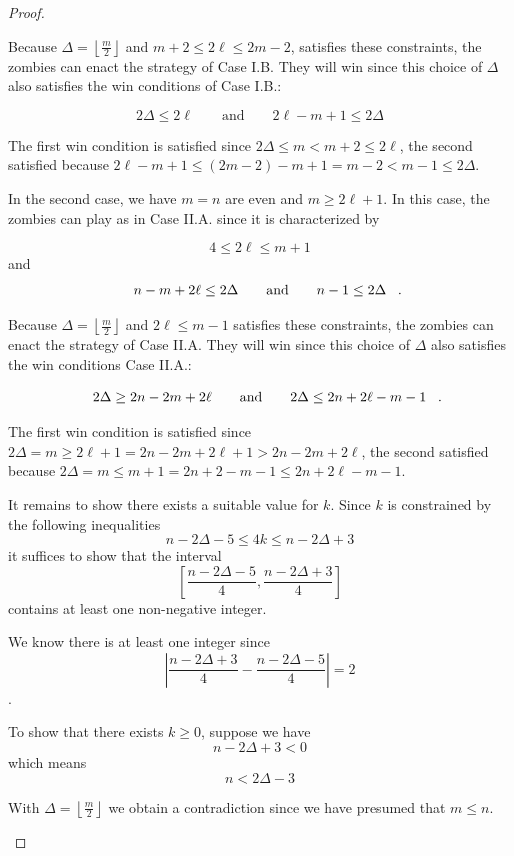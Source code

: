 \begin{proof}
\begin{proofpart}
Because $\Delta  = \left\lfloor \frac{m}{2} \right\rfloor$ and $m+2 \leq 2\ell \leq 2m-2$, satisfies these constraints, the zombies can enact the strategy of Case I.B. They will win since this choice of $\Delta$ also satisfies the win conditions of Case I.B.:

\[ 2\Delta \leq 2 \ell \qquad \text{and} \qquad 2\ell -m+1 \leq 2\Delta \]

The first win condition is satisfied since $2\Delta \leq m < m+2 \leq 2\ell$, the second satisfied because $2\ell -m+1 \leq (2m-2)- m+1 = m-2 < m-1 \leq 2\Delta$.

In the second case, we have $m = n$ are even and $m \geq 2\ell+1$. In this case, the zombies can play as in Case II.A. since it is characterized by

\[ 4 \leq 2 \ell \leq m + 1\]
and
\[ n -m + 2\ell \leq 2 \Delta \qquad \text{and} \qquad n-1 \leq 2 \Delta \mperiod \]

Because $\Delta  = \left\lfloor \frac{m}{2} \right\rfloor$ and $2 \ell \leq m -1$ satisfies these constraints, the zombies can enact the strategy of Case II.A. They will win since this choice of $\Delta$ also satisfies the win conditions Case II.A.:

\[ 2 \Delta \geq 2n - 2m + 2\ell \qquad \text{and} \qquad 2 \Delta \leq 2n + 2\ell - m - 1 \mperiod \]

The first win condition is satisfied since $2\Delta = m \geq 2\ell +1 = 2n - 2m +2\ell +1 > 2n-2m+2\ell$, the second satisfied because $2 \Delta =m \leq m + 1 = 2n+2 -m -1 \leq 2n + 2\ell - m - 1$.

It remains to show there exists a suitable value for $k$. Since $k$ is constrained by the following inequalities
\[ n - 2\Delta -5 \leq 4k \leq n-2\Delta +3 \]
it suffices to show that the interval
\[ [ \frac{n-2\Delta -5}{4}, \frac{n-2\Delta+3}{4}] \]
contains at least one non-negative integer.

We know there is at least one integer since
\[ \left\lvert \frac{n-2\Delta+3}{4} - \frac{n-2\Delta -5}{4} \right\rvert = 2 \].

To show that there exists $k \geq 0$, suppose we have
\[ n- 2\Delta +3 < 0 \]
which means
\[ n < 2\Delta -3 \]

With $\Delta = \left\lfloor \frac{m}{2} \right\rfloor$ we obtain a contradiction since we have presumed that $m \leq n$.

\end{proofpart}
\end{proof}

